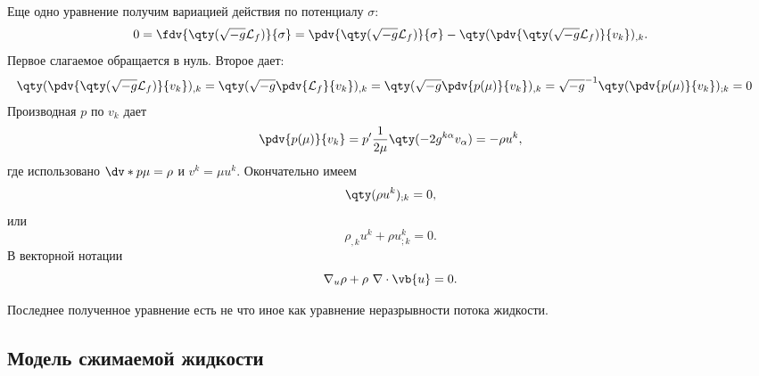 \documentclass[\docroot/reports/draft/report.tex]{subfiles}
\begin{document}
    Еще одно уравнение получим вариацией действия по потенциалу $\sigma$:
    \begin{equation*}
        0 = \fdv{\qty(\sqrt{-g} \mathcal{L}_f)}{\sigma} =
            \pdv{\qty(\sqrt{-g} \mathcal{L}_f)}{\sigma} -
            \qty(\pdv{\qty(\sqrt{-g} \mathcal{L}_f)}{v_k})_{,k} .
    \end{equation*}
    Первое слагаемое обращается в нуль. Второе дает:
    \begin{equation*}\begin{aligned}
        \qty(\pdv{\qty(\sqrt{-g} \mathcal{L}_f)}{v_k})_{,k} &=
        \qty(\sqrt{-g} \pdv{\mathcal{L}_f}{v_k})_{,k} =
        \qty(\sqrt{-g} \pdv{p(\mu)}{v_k})_{,k} =
        \sqrt{-g}^{-1} \qty(\pdv{p(\mu)}{v_k})_{;k} = 0
    \end{aligned}\end{equation*}
    Производная $p$ по $v_k$ дает
    \begin{equation*}
        \pdv{p(\mu)}{v_k} = p' \frac{1}{2 \mu} \qty(- 2 g^{k\alpha} v_\alpha) = - \rho u^k ,
    \end{equation*}
    где использовано $\dv*{p}{\mu} = \rho$ и $v^k = \mu u^k$. Окончательно имеем
    \begin{equation*}
        \qty(\rho u^k)_{;k} = 0 ,
    \end{equation*}
    или
    \begin{equation*}
        \rho_{,k} u^k + \rho u^k_{;k} = 0 .
    \end{equation*}
    В векторной нотации
    \begin{equation}
        \nabla_u \rho + \rho\ \nabla \cdot \vb{u} = 0 .
    \end{equation}

    Последнее полученное уравнение есть не что иное как уравнение неразрывности потока жидкости.

\subsection{Модель сжимаемой жидкости}
\end{document}
